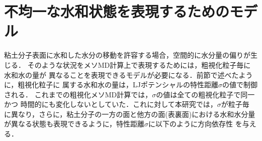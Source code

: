 \section{不均一な水和状態を表現するためのモデル}
粘土分子表面に水和した水分の移動を許容する場合，空間的に水分量の偏りが生じる．
そのような状況をメソMD計算上で表現するためには，粗視化粒子毎に水和水の量が
異なることを表現できるモデルが必要になる．前節で述べたように，粗視化粒子に
属する水和水の量は，LJポテンシャルの特性距離$\sigma$の値で制御される．
これまでの粗視化メソMD計算では，$\sigma$の値は全ての粗視化粒子で同一かつ
時間的にも変化しないとしていた．これに対して本研究では，$\sigma$が粒子毎
に異なり，さらに，粘土分子の一方の面と他方の面(表裏面)における水和水分量
が異なる状態も表現できるように，特性距離$\sigma$に以下のように方向依存性
を与える．\\

